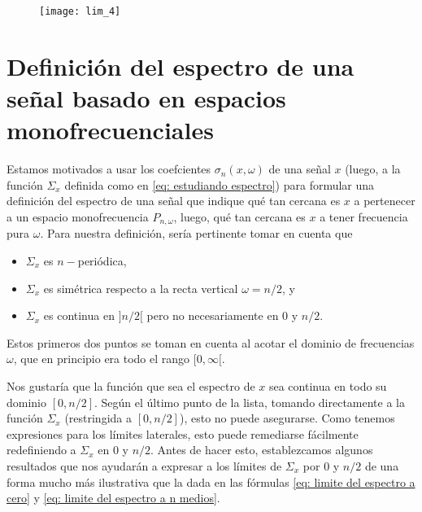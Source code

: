 \begin{figure}[H]
	\centering
	\texttt{[image: lim\_4]} 
\end{figure}


\section{Definición del espectro de una señal basado en espacios monofrecuenciales}

Estamos motivados a usar los coefcientes
$\sigma_{n}(x, \omega)$ de una señal $x$
(luego, a la función $\Sigma_{x}$ definida como en 
\eqref{eq: estudiando espectro}) para formular una definición
del espectro de una señal que indique qué tan cercana
es $x$ a pertenecer a un espacio monofrecuencia
$P_{n, \omega}$, luego, qué tan cercana es $x$ a tener
frecuencia pura $\omega$. Para nuestra definición, sería pertinente tomar
en cuenta que 

\begin{itemize}
\item $\Sigma_{x}$ es $n-$periódica, 
\item $\Sigma_{x}$ es simétrica respecto a la recta
vertical $\omega = n/2$, y
\item $\Sigma_{x}$ es continua en $]n/2[$ pero no necesariamente
en $0$ y $n/2$.
\end{itemize}
Estos primeros dos puntos se toman en cuenta al acotar
el dominio de frecuencias $\omega$, que en principio
era todo el rango $[0, \infty[$.

Nos gustaría que la función que sea el espectro de $x$
sea continua en todo su dominio
$[0, n/2]$. Según el último punto de la lista, tomando
directamente a la función $\Sigma_{x}$ (restringida a 
$[0,n/2]$), esto no puede asegurarse.
Como tenemos expresiones para los límites laterales, esto puede
remediarse fácilmente redefiniendo a 
$\Sigma_{x}$ en $0$ y $n/2$. Antes de hacer esto, 
establezcamos algunos resultados que nos ayudarán a expresar
a los límites de $\Sigma_{x}$ por $0$ y $n/2$
de una forma mucho más ilustrativa que la dada
en las fórmulas 
\eqref{eq: limite del espectro a cero}
y
\eqref{eq: limite del espectro a n medios}.


